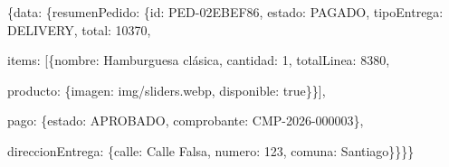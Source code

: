 \documentclass[10pt,letterpaper]{article}
\begin{document}
{\footnotesize\ttfamily\raggedright\setlength{\parskip}{0pt}
\{\textquotedbl{}data\textquotedbl{}: \{\textquotedbl{}resumenPedido\textquotedbl{}: \{\textquotedbl{}id\textquotedbl{}: \textquotedbl{}PED-02EBEF86\textquotedbl{}, \textquotedbl{}estado\textquotedbl{}: \textquotedbl{}PAGADO\textquotedbl{}, \textquotedbl{}tipoEntrega\textquotedbl{}: \textquotedbl{}DELIVERY\textquotedbl{}, \textquotedbl{}total\textquotedbl{}: 10370,\par
\textquotedbl{}items\textquotedbl{}: [\{\textquotedbl{}nombre\textquotedbl{}: \textquotedbl{}Hamburguesa clásica\textquotedbl{}, \textquotedbl{}cantidad\textquotedbl{}: 1, \textquotedbl{}totalLinea\textquotedbl{}: 8380,\par
\textquotedbl{}producto\textquotedbl{}: \{\textquotedbl{}imagen\textquotedbl{}: \textquotedbl{}img/\allowbreak{}sliders.\allowbreak{}webp\textquotedbl{}, \textquotedbl{}disponible\textquotedbl{}: true\}\}],\par
\textquotedbl{}pago\textquotedbl{}: \{\textquotedbl{}estado\textquotedbl{}: \textquotedbl{}APROBADO\textquotedbl{}, \textquotedbl{}comprobante\textquotedbl{}: \textquotedbl{}CMP-2026-000003\textquotedbl{}\},\par
\textquotedbl{}direccionEntrega\textquotedbl{}: \{\textquotedbl{}calle\textquotedbl{}: \textquotedbl{}Calle Falsa\textquotedbl{}, \textquotedbl{}numero\textquotedbl{}: \textquotedbl{}123\textquotedbl{}, \textquotedbl{}comuna\textquotedbl{}: \textquotedbl{}Santiago\textquotedbl{}\}\}\}\}\par}
\end{document}
